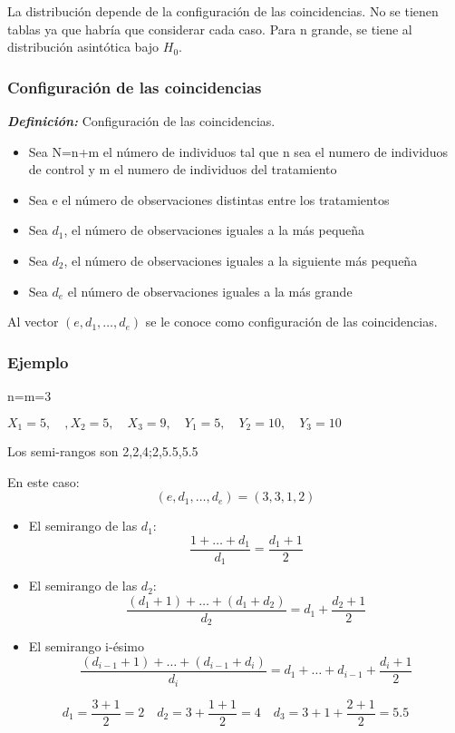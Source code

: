 La distribución depende de la configuración de las coincidencias. No se tienen tablas ya que habría que considerar cada caso.
Para n grande, se tiene al distribución asintótica bajo $H_0$.
\subsubsection{Configuración de las coincidencias}
\textit{\textbf{Definición: }}Configuración de las coincidencias. 
\begin{itemize}
    \item Sea N=n+m el número de individuos tal que n sea el numero de individuos de control y m el numero de individuos del tratamiento
    \item Sea e el número de observaciones distintas entre los tratamientos
    \item Sea $d_1$, el número de observaciones iguales a la más pequeña
    \item Sea $d_2$, el número de observaciones iguales a la siguiente más pequeña
    \item Sea $d_e$ el número de observaciones iguales a la más grande
\end{itemize}

Al vector $(e,d_1,\dots,d_e)$ se le conoce como configuración de las coincidencias.

\subsubsection*{Ejemplo}
n=m=3

\(
X_1=5, \quad, X_2=5, \quad X_3=9, \quad Y_1=5,\quad Y_2=10,\quad Y_3=10
\)

Los semi-rangos son 2,2,4;2,5.5,5.5

En este caso:
\[
    (e,d_1,\dots,d_e)=(3,3,1,2)
\]
\begin{itemize}
    \item El semirango de las $d_1$:
    \[
        \frac{1+\dots+d_1}{d_1}=\frac{d_1+1}{2}
    \]
    \item El semirango de las $d_2$:
    \[
        \frac{(d_1+1)+\dots+(d_1+d_2)}{d_2}=d_1+\frac{d_2+1}{2}
    \]
    \item El semirango i-ésimo
    \[
        \frac{(d_{i-1}+1)+\dots+(d_{i-1}+d_i)}{d_i}=d_1+\dots+d_{i-1}+\frac{d_i+1}{2}
    \]
\end{itemize}

\[
    d_1=\frac{3+1}{2}=2 \quad d_2=3+\frac{1+1}{2}=4 \quad d_3=3+1+\frac{2+1}{2}=5.5
\]

